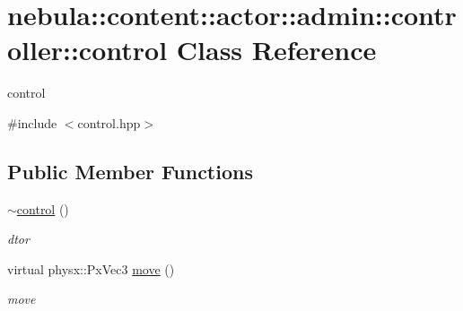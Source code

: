 \hypertarget{classnebula_1_1content_1_1actor_1_1admin_1_1controller_1_1control}{
\section{nebula::content::actor::admin::controller::control Class Reference}
\label{classnebula_1_1content_1_1actor_1_1admin_1_1controller_1_1control}
}


control  


{\ttfamily \#include $<$control.hpp$>$}\subsection*{Public Member Functions}
\begin{DoxyCompactItemize}
\item 
\hyperlink{classnebula_1_1content_1_1actor_1_1admin_1_1controller_1_1control_afd0ef4ca6eb5e0bd193cd094fa521930}{$\sim$control} ()
\begin{DoxyCompactList}\small\item\em dtor \item\end{DoxyCompactList}\item 
virtual physx::PxVec3 \hyperlink{classnebula_1_1content_1_1actor_1_1admin_1_1controller_1_1control_ae89c14aaec5775c76952477ef03e022f}{move} ()
\begin{DoxyCompactList}\small\item\em move \item\end{DoxyCompactList}\end{DoxyCompactItemize}
